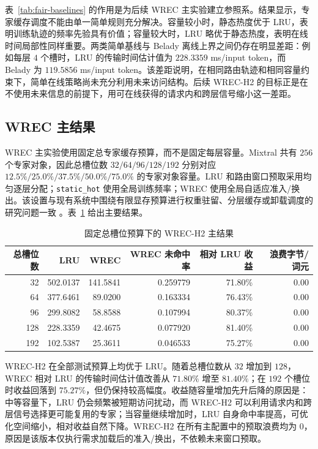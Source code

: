 表~\ref{tab:fair-baselines} 的作用是为后续 WREC 主实验建立参照系。结果显示，专家缓存调度不能由单一简单规则充分解决。容量较小时，静态热度优于 LRU，表明训练轨迹的频率先验具有价值；容量较大时，LRU 略优于静态热度，表明在线时间局部性同样重要。两类简单基线与 Belady 离线上界之间仍存在明显差距：例如每层 $4$ 个槽时，LRU 的传输时间估计值为 $228.3359$ ms/input token，而 Belady 为 $119.5856$ ms/input token。该差距说明，在相同路由轨迹和相同容量约束下，简单在线策略尚未充分利用未来访问结构。后续 WREC-H2 的目标正是在不使用未来信息的前提下，用可在线获得的请求内和跨层信号缩小这一差距。

\subsection{WREC 主结果}

WREC 主实验使用固定总专家缓存预算，而不是固定每层容量。Mixtral 共有 $256$ 个专家对象，因此总槽位数 $32/64/96/128/192$ 分别对应 $12.5\%/25.0\%/37.5\%/50.0\%/75.0\%$ 的专家对象容量。LRU 和路由窗口预取采用均匀逐层分配；\texttt{static\_hot} 使用全局训练频率；WREC 使用全局自适应准入/换出。该设置与现有系统中围绕有限显存预算进行权重驻留、分层缓存或卸载调度的研究问题一致 \cite{sheng2023flexgen,song2023powerinfer,xue2024moeinfinity,cao2025moelightning}。表~\ref{tab:wrec-main-result} 给出主要结果。

\begin{table}[!htbp]
    \centering
    \caption{\label{tab:wrec-main-result}固定总槽位预算下的 WREC-H2 主结果}
    \begin{tabularx}{\linewidth}{rrrrrr}
        \hline
        总槽位数 & LRU & WREC & WREC 未命中率 & 相对 LRU 收益 & 浪费字节/词元 \\ \hline
        32 & 502.0137 & 141.5841 & 0.259779 & 71.80\% & 0.00 \\ \hline
        64 & 377.6461 & 89.0200 & 0.163334 & 76.43\% & 0.00 \\ \hline
        96 & 299.8082 & 58.8588 & 0.107994 & 80.37\% & 0.00 \\ \hline
        128 & 228.3359 & 42.4675 & 0.077920 & 81.40\% & 0.00 \\ \hline
        192 & 102.5387 & 25.3611 & 0.046533 & 75.27\% & 0.00 \\ \hline
    \end{tabularx}
\end{table}
\FloatBarrier

WREC-H2 在全部测试预算上均优于 LRU。随着总槽位数从 $32$ 增加到 $128$，WREC 相对 LRU 的传输时间估计值改善从 $71.80\%$ 增至 $81.40\%$；在 $192$ 个槽位时收益回落到 $75.27\%$，但仍保持较高幅度。收益随容量增加先升后降的原因是：中等容量下，LRU 仍会频繁被短期访问扰动，而 WREC-H2 可以利用请求内和跨层信号选择更可能复用的专家；当容量继续增加时，LRU 自身命中率提高，可优化空间缩小，相对收益自然下降。WREC-H2 在所有主配置中的预取浪费均为 $0$，原因是该版本仅执行需求加载后的准入/换出，不依赖未来窗口预取。

